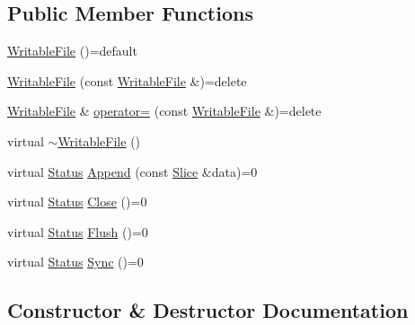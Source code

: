 \subsection*{Public Member Functions}
\begin{DoxyCompactItemize}
\item 
\mbox{\hyperlink{classleveldb_1_1_writable_file_a7dc6ec8aa3c8b4d28130ccc2791f884a}{Writable\+File}} ()=default
\item 
\mbox{\hyperlink{classleveldb_1_1_writable_file_afda8e9b2d4783258701f556cd82dd22c}{Writable\+File}} (const \mbox{\hyperlink{classleveldb_1_1_writable_file}{Writable\+File}} \&)=delete
\item 
\mbox{\hyperlink{classleveldb_1_1_writable_file}{Writable\+File}} \& \mbox{\hyperlink{classleveldb_1_1_writable_file_a953e5d740da7a2ff3dccdca043901bb3}{operator=}} (const \mbox{\hyperlink{classleveldb_1_1_writable_file}{Writable\+File}} \&)=delete
\item 
virtual \mbox{\hyperlink{classleveldb_1_1_writable_file_a98027e2f2e97b75b189eefa47e5bf4a1}{$\sim$\+Writable\+File}} ()
\item 
virtual \mbox{\hyperlink{classleveldb_1_1_status}{Status}} \mbox{\hyperlink{classleveldb_1_1_writable_file_a53b41841d9577d28f65d4d90e1660de8}{Append}} (const \mbox{\hyperlink{classleveldb_1_1_slice}{Slice}} \&data)=0
\item 
virtual \mbox{\hyperlink{classleveldb_1_1_status}{Status}} \mbox{\hyperlink{classleveldb_1_1_writable_file_a2efbf9c02a26028b5002df73b4393915}{Close}} ()=0
\item 
virtual \mbox{\hyperlink{classleveldb_1_1_status}{Status}} \mbox{\hyperlink{classleveldb_1_1_writable_file_ab95759ad32f6a05b0ee4266969fa265e}{Flush}} ()=0
\item 
virtual \mbox{\hyperlink{classleveldb_1_1_status}{Status}} \mbox{\hyperlink{classleveldb_1_1_writable_file_a2d2dcef02a2c9e71f3d39125bcd5a606}{Sync}} ()=0
\end{DoxyCompactItemize}


\subsection{Constructor \& Destructor Documentation}
\mbox{\label{classleveldb_1_1_writable_file_a7dc6ec8aa3c8b4d28130ccc2791f884a}} 
